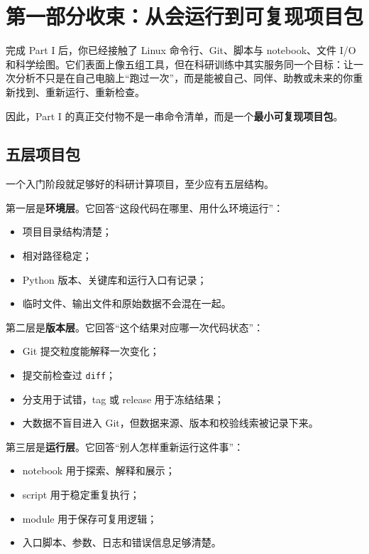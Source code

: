 \chapter*{第一部分收束：从会运行到可复现项目包}

完成 Part I 后，你已经接触了 Linux 命令行、Git、脚本与 notebook、文件 I/O 和科学绘图。它们表面上像五组工具，但在科研训练中其实服务同一个目标：让一次分析不只是在自己电脑上“跑过一次”，而是能被自己、同伴、助教或未来的你重新找到、重新运行、重新检查。

因此，Part I 的真正交付物不是一串命令清单，而是一个\textbf{最小可复现项目包}。

\section*{五层项目包}

一个入门阶段就足够好的科研计算项目，至少应有五层结构。

第一层是\textbf{环境层}。它回答“这段代码在哪里、用什么环境运行”：

\begin{itemize}
    \item 项目目录结构清楚；
    \item 相对路径稳定；
    \item Python 版本、关键库和运行入口有记录；
    \item 临时文件、输出文件和原始数据不会混在一起。
\end{itemize}

第二层是\textbf{版本层}。它回答“这个结果对应哪一次代码状态”：

\begin{itemize}
    \item Git 提交粒度能解释一次变化；
    \item 提交前检查过 \texttt{diff}；
    \item 分支用于试错，tag 或 release 用于冻结结果；
    \item 大数据不盲目进入 Git，但数据来源、版本和校验线索被记录下来。
\end{itemize}

第三层是\textbf{运行层}。它回答“别人怎样重新运行这件事”：

\begin{itemize}
    \item notebook 用于探索、解释和展示；
    \item script 用于稳定重复执行；
    \item module 用于保存可复用逻辑；
    \item 入口脚本、参数、日志和错误信息足够清楚。
\end{itemize}

